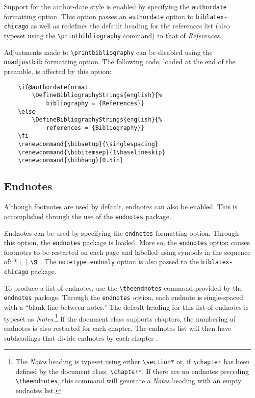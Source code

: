 \documentclass{article}
\begin{document}
%
Support for the author-date style is enabled by specifying the \texttt{authordate} formatting option. This option passes an \texttt{authordate} option to \texttt{biblatex-chicago} as well as redefines the default heading for the references list (also typeset using the \texttt{\textbackslash printbibliography} command) to that of \emph{References}.

%
Adjustments made to \texttt{\textbackslash printbibliography} can be disabled using the \texttt{noadjustbib} formatting option. The following code, loaded at the end of the preamble, is affected by this option:
\begin{lstlisting}
	\if@authordateformat
		\DefineBibliographyStrings{english}{%
			bibliography = {References}}
	\else
		\DefineBibliographyStrings{english}{%
			references = {Bibliography}}
	\fi
	\renewcommand{\bibsetup}{\singlespacing}
	\renewcommand{\bibitemsep}{1\baselineskip}
	\renewcommand{\bibhang}{0.5in}
\end{lstlisting}


\subsection{Endnotes}

Although footnotes are used by default, endnotes can also be enabled. This is accomplished through the use of the \texttt{endnotes} package.

%
Endnotes can be used by specifying the \texttt{endnotes} formatting option. Through this option, the \texttt{endnotes} package is loaded. More so, the \texttt{endnotes} option causes footnotes to be restarted on each page and labelled using symbols in the sequence of: * $\dagger$ $\ddagger$ $\S$ \autocite[156]{turabian_manual_2013}. The \texttt{notetype=endonly} option is also passed to the \texttt{biblatex-chicago} package.

To produce a list of endnotes, use the \texttt{\textbackslash theendnotes} command provided by the \texttt{endnotes} package. Through the \texttt{endnotes} option, each endnote is single-spaced with a ``blank line between notes." The default heading for this list of endnotes is typeset as \emph{Notes}.\footnote{%
	The \emph{Notes} heading is typeset using either \texttt{\textbackslash section*} or, if \texttt{\textbackslash chapter} has been defined by the document class, \texttt{\textbackslash chapter*}. If there are no endnotes preceding \texttt{\textbackslash theendnotes}, this command will generate a \emph{Notes} heading with an empty endnotes list.}
If the document class supports chapters, the numbering of endnotes is also restarted for each chapter. The endnotes list will then have subheadings that divide endnotes by each chapter \autocite[157]{turabian_manual_2013}.
\end{document}
